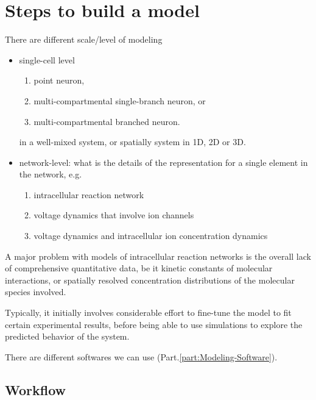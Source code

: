 \chapter{Steps to build a model}

There are different scale/level of modeling
\begin{itemize}
  \item single-cell level
  \begin{enumerate}
    \item point neuron, 
    
    \item multi-compartmental single-branch neuron, or 
    
    \item multi-compartmental branched neuron.
  \end{enumerate}  
  in a well-mixed system, or spatially system in 1D, 2D or 3D.

  \item network-level: what is the details of the representation for a single
  element in the network, e.g. 
  \begin{enumerate}
    
    \item intracellular reaction network
  
    \item voltage dynamics that involve ion channels
  
    \item voltage dynamics and intracellular ion concentration dynamics 
  \end{enumerate}
  
\end{itemize}

A major problem with models of intracellular reaction networks is the overall
lack of comprehensive quantitative data, be it kinetic constants of molecular
interactions, or spatially resolved concentration distributions of the molecular
species involved.

Typically, it initially involves considerable effort to fine-tune the model to
fit certain experimental results, before being able to use simulations to
explore the predicted behavior of the system.

There are different softwares we can use (Part.\ref{part:Modeling-Software}).

\section{Workflow}

